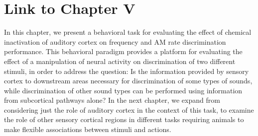 \section{Link to Chapter V}
In this chapter, we present a behavioral task for evaluating the effect of chemical inactivation of auditory cortex on frequency and AM rate discrimination performance. 
%
This behavioral paradigm provides a platform for evaluating the effect of a manipulation of neural activity on discrimination of two different stimuli, in order to address the question: Is the information provided by sensory cortex to downstream areas necessary for discrimination of some types of sounds, while discrimination of other sound types can be performed using information from subcortical pathways alone?
%
In the next chapter, we expand from considering just the role of auditory cortex in the context of this task, to examine the role of other sensory cortical regions in different tasks requiring animals to make flexible associations between stimuli and actions. 

